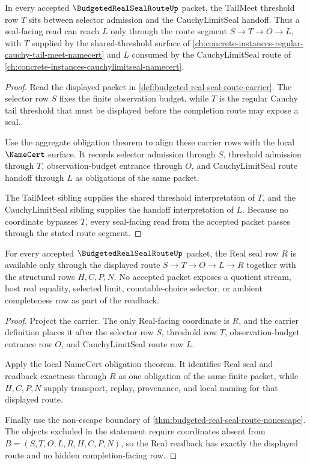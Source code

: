 \begin{theorem}
\label{thm:budgeted-real-seal-route-tail-threshold-handoff}
In every accepted $\BudgetedRealSealRouteUp$ packet, the TailMeet threshold row $T$ sits between selector admission and the CauchyLimitSeal handoff. Thus a seal-facing read can reach $L$ only through the route segment $S \to T \to O \to L$, with $T$ supplied by the shared-threshold surface of \autoref{ch:concrete-instances-regular-cauchy-tail-meet-namecert} and $L$ consumed by the CauchyLimitSeal route of \autoref{ch:concrete-instances-cauchylimitseal-namecert}.
\end{theorem}
\begin{proof}
Read the displayed packet in \autoref{def:budgeted-real-seal-route-carrier}. The selector row $S$ fixes the finite observation budget, while $T$ is the regular Cauchy tail threshold that must be displayed before the completion route may expose a seal.

Use the aggregate obligation theorem to align these carrier rows with the local $\NameCert$ surface. It records selector admission through $S$, threshold admission through $T$, observation-budget entrance through $O$, and CauchyLimitSeal route handoff through $L$ as obligations of the same packet.

The TailMeet sibling supplies the shared threshold interpretation of $T$, and the CauchyLimitSeal sibling supplies the handoff interpretation of $L$. Because no coordinate bypasses $T$, every seal-facing read from the accepted packet passes through the stated route segment.
\end{proof}

\begin{theorem}
\label{thm:budgeted-real-seal-route-real-seal-readback-exactness}
For every accepted $\BudgetedRealSealRouteUp$ packet, the Real seal row $R$ is available only through the displayed route $S \to T \to O \to L \to R$ together with the structural rows $H,C,P,N$. No accepted packet exposes a quotient stream, host real equality, selected limit, countable-choice selector, or ambient completeness row as part of the readback.
\end{theorem}
\begin{proof}
Project the carrier. The only Real-facing coordinate is $R$, and the carrier definition places it after the selector row $S$, threshold row $T$, observation-budget entrance row $O$, and CauchyLimitSeal route row $L$.

Apply the local NameCert obligation theorem. It identifies Real seal and readback exactness through $R$ as one obligation of the same finite packet, while $H,C,P,N$ supply transport, replay, provenance, and local naming for that displayed route.

Finally use the non-escape boundary of \autoref{thm:budgeted-real-seal-route-nonescape}. The objects excluded in the statement require coordinates absent from $B=(S,T,O,L,R,H,C,P,N)$, so the Real readback has exactly the displayed route and no hidden completion-facing row.
\end{proof}

